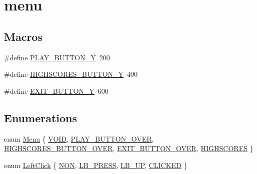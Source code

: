 \hypertarget{group__menu}{}\section{menu}
\label{group__menu}
\subsection*{Macros}
\begin{DoxyCompactItemize}
\item 
\#define \mbox{\hyperlink{group__menu_ga6c389840e668d04350b29c13c2650a20}{P\+L\+A\+Y\+\_\+\+B\+U\+T\+T\+O\+N\+\_\+Y}}~200
\item 
\#define \mbox{\hyperlink{group__menu_gad6554b0db395ff6f8ad6d1ea11988b3a}{H\+I\+G\+H\+S\+C\+O\+R\+E\+S\+\_\+\+B\+U\+T\+T\+O\+N\+\_\+Y}}~400
\item 
\#define \mbox{\hyperlink{group__menu_ga5c2fee47b6e9a8dc63fee2efa67e6cdd}{E\+X\+I\+T\+\_\+\+B\+U\+T\+T\+O\+N\+\_\+Y}}~600
\end{DoxyCompactItemize}
\subsection*{Enumerations}
\begin{DoxyCompactItemize}
\item 
enum \mbox{\hyperlink{group__menu_gaf3d52afbb0d088f62e02208b24a9cbd2}{Menu}} \{ \newline
\mbox{\hyperlink{group__menu_ggaf3d52afbb0d088f62e02208b24a9cbd2adb31f5ef7acca5e1131fcc0fbfa6911d}{V\+O\+ID}}, 
\mbox{\hyperlink{group__menu_ggaf3d52afbb0d088f62e02208b24a9cbd2aa81ee30dcc5d856491c4e12e6e2a42d2}{P\+L\+A\+Y\+\_\+\+B\+U\+T\+T\+O\+N\+\_\+\+O\+V\+ER}}, 
\mbox{\hyperlink{group__menu_ggaf3d52afbb0d088f62e02208b24a9cbd2ab3bb28a5789fce48c45c6830bac5f2b4}{H\+I\+G\+H\+S\+C\+O\+R\+E\+S\+\_\+\+B\+U\+T\+T\+O\+N\+\_\+\+O\+V\+ER}}, 
\mbox{\hyperlink{group__menu_ggaf3d52afbb0d088f62e02208b24a9cbd2a0c981cad31fd7d79a58bb019a1c9974f}{E\+X\+I\+T\+\_\+\+B\+U\+T\+T\+O\+N\+\_\+\+O\+V\+ER}}, 
\newline
\mbox{\hyperlink{group__menu_ggaf3d52afbb0d088f62e02208b24a9cbd2a806f5c5dcdfbc2cd5bb618a46a3b3b7e}{H\+I\+G\+H\+S\+C\+O\+R\+ES}}
 \}
\item 
enum \mbox{\hyperlink{group__menu_ga6cd15c139ec2e31ed2f511e39e296376}{Left\+Click}} \{ \mbox{\hyperlink{group__menu_gga6cd15c139ec2e31ed2f511e39e296376a7905fcd753e9915a521ea77aa7066415}{N\+ON}}, 
\mbox{\hyperlink{group__menu_gga6cd15c139ec2e31ed2f511e39e296376afa1b8831b57340bca943b97b8853818b}{L\+B\+\_\+\+P\+R\+E\+SS}}, 
\mbox{\hyperlink{group__menu_gga6cd15c139ec2e31ed2f511e39e296376a76001978f4f5fef37bdf49ca0a2cbc90}{L\+B\+\_\+\+UP}}, 
\mbox{\hyperlink{group__menu_gga6cd15c139ec2e31ed2f511e39e296376ad37324c719e7d564128110e054a550e4}{C\+L\+I\+C\+K\+ED}}
 \}
\end{DoxyCompactItemize}
